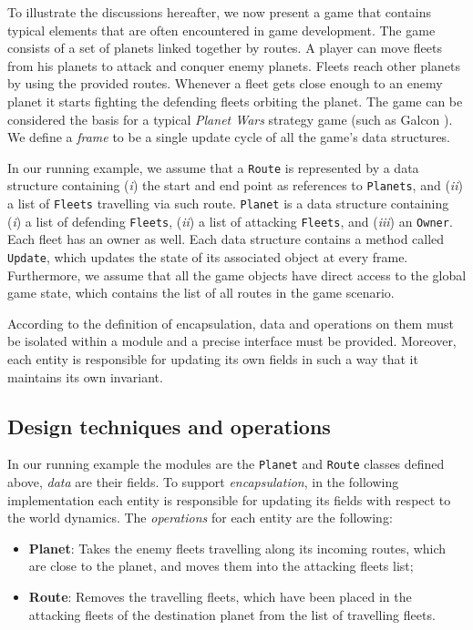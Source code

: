 To illustrate the discussions hereafter, we now present a game that contains typical elements that are often encountered in game development. The game consists of a set of planets linked together by routes. A player can move fleets from his planets to attack and conquer enemy planets. Fleets reach other planets by using the provided routes. Whenever a fleet gets close enough to an enemy planet it starts fighting the defending fleets orbiting the planet. The game can be considered the basis for a typical \emph{Planet Wars} strategy game (such as Galcon \cite{wiki:galcon}). We define a \textit{frame} to be a single update cycle of all the game's data structures.

In our running example, we assume that a \texttt{Route} is represented by a data structure containing (\textit{i}) the start and end point as references to \texttt{Planets}, and (\textit{ii}) a list of \texttt{Fleets} travelling via such route. \texttt{Planet} is a data structure containing (\textit{i}) a list of defending \texttt{Fleets}, (\textit{ii}) a list of attacking \texttt{Fleets}, and (\textit{iii}) an \texttt{Owner}. Each fleet has an owner as well. Each data structure contains a method called \texttt{Update}, which updates the state of its associated object at every frame. Furthermore, we assume that all the game objects have direct access to the global game state, which contains the list of all routes in the game scenario.



According to the definition of encapsulation, data and operations on them must be isolated within a module and a precise interface must be provided. Moreover, each entity is responsible for updating its own fields in such a way that it maintains its own invariant.

\subsection{Design techniques and operations}

In our running example the modules are the \texttt{Planet} and \texttt{Route} classes defined above, \textit{data} are their fields. To support \emph{encapsulation}, in the following implementation each entity is responsible for updating its fields with respect to the world dynamics. The \textit{operations} for each entity are the following:
\begin{itemize}
    \item[] \textbf{Planet}: Takes the enemy fleets travelling along its incoming routes, which are close to the planet, and moves them into the attacking fleets list;
    \item[] \textbf{Route}: Removes the travelling fleets, which have been placed in the attacking fleets of the destination planet from the list of travelling fleets.
\end{itemize}

